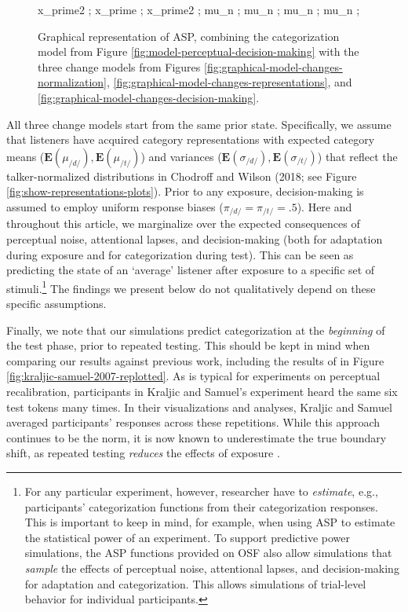 \documentclass[
  11pt,
  man,floatsintext]{apa6}
\begin{document}
\begin{figure}
{%
     {x_prime2} ; %
     {x_prime} ; %
     {x_prime2} ; %
     {mu_n} ; %
     {mu_n} ; %
     {mu_n} ; %
     {mu_n} ; %
}
\caption{Graphical representation of ASP, combining the categorization model from Figure \ref{fig:model-perceptual-decision-making} with the three change models from Figures \ref{fig:graphical-model-changes-normalization}, \ref{fig:graphical-model-changes-representations}, and \ref{fig:graphical-model-changes-decision-making}.}\label{fig:graphical-model-all}
\end{figure}

All three change models start from the same prior state. Specifically, we assume that listeners have acquired category representations with expected category means (\(\mathbf{E}(\mu_{/d/}), \mathbf{E}(\mu_{/t/})\)) and variances (\(\mathbf{E}(\sigma_{/d/}), \mathbf{E}(\sigma_{/t/})\)) that reflect the talker-normalized distributions in Chodroff and Wilson (2018; see Figure \ref{fig:show-representations-plots}). Prior to any exposure, decision-making is assumed to employ uniform response biases (\(\pi_{/d/}=\pi_{/t/}=.5\)). Here and throughout this article, we marginalize over the expected consequences of perceptual noise, attentional lapses, and decision-making (both for adaptation during exposure and for categorization during test). This can be seen as predicting the state of an `average' listener after exposure to a specific set of stimuli.\footnote{For any particular experiment, however, researcher have to \emph{estimate}, e.g., participants' categorization functions from their categorization responses. This is important to keep in mind, for example, when using ASP to estimate the statistical power of an experiment. To support predictive power simulations, the ASP functions provided on OSF also allow simulations that \emph{sample} the effects of perceptual noise, attentional lapses, and decision-making for adaptation and categorization. This allows simulations of trial-level behavior for individual participants.} The findings we present below do not qualitatively depend on these specific assumptions.

Finally, we note that our simulations predict categorization at the \emph{beginning} of the test phase, prior to repeated testing. This should be kept in mind when comparing our results against previous work, including the results of \textcite{kraljic-samuel2007} in Figure \ref{fig:kraljic-samuel-2007-replotted}. As is typical for experiments on perceptual recalibration, participants in Kraljic and Samuel's experiment heard the same six test tokens many times. In their visualizations and analyses, Kraljic and Samuel averaged participants' responses across these repetitions. While this approach continues to be the norm, it is now known to underestimate the true boundary shift, as repeated testing \emph{reduces} the effects of exposure \autocites{mitterer2011-perceptual-recalibration,liu-jaeger2018,liu-jaeger2019,scharenborg-janse2013,zheng-samuel2023}[for early discussion, see][11]{norris2003}.
\end{document}
